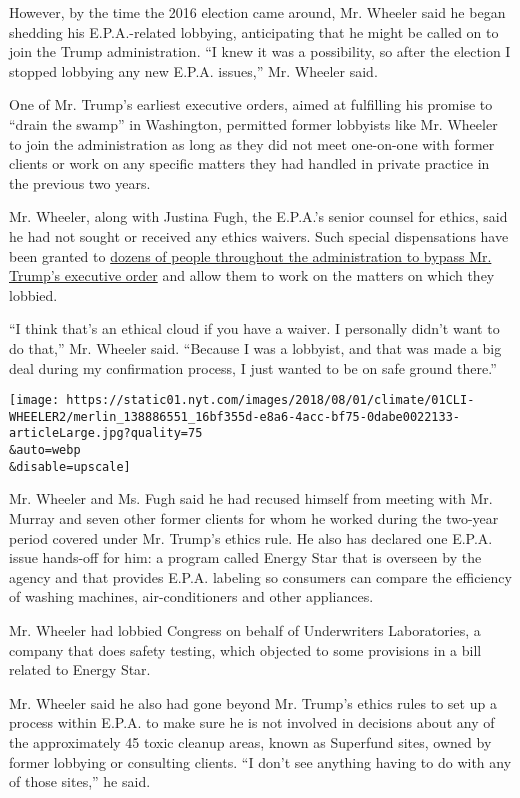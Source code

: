 However, by the time the 2016 election came around, Mr. Wheeler said he
began shedding his E.P.A.-related lobbying, anticipating that he might
be called on to join the Trump administration. ``I knew it was a
possibility, so after the election I stopped lobbying any new E.P.A.
issues,'' Mr. Wheeler said.

One of Mr. Trump's earliest executive orders, aimed at fulfilling his
promise to ``drain the swamp'' in Washington, permitted former lobbyists
like Mr. Wheeler to join the administration as long as they did not meet
one-on-one with former clients or work on any specific matters they had
handled in private practice in the previous two years.

Mr. Wheeler, along with Justina Fugh, the E.P.A.'s senior counsel for
ethics, said he had not sought or received any ethics waivers. Such
special dispensations have been granted to
\href{https://www.nytimes.com/2017/06/07/us/politics/lobbyists-ethics-waivers-trump-administration.html}{dozens
of people throughout the administration to bypass Mr. Trump's executive
order} and allow them to work on the matters on which they lobbied.

``I think that's an ethical cloud if you have a waiver. I personally
didn't want to do that,'' Mr. Wheeler said. ``Because I was a lobbyist,
and that was made a big deal during my confirmation process, I just
wanted to be on safe ground there.''

\texttt{[image: https://static01.nyt.com/images/2018/08/01/climate/01CLI-WHEELER2/merlin\_138886551\_16bf355d-e8a6-4acc-bf75-0dabe0022133-articleLarge.jpg?quality=75\\\&auto=webp\\\&disable=upscale]}

Mr. Wheeler and Ms. Fugh said he had recused himself from meeting with
Mr. Murray and seven other former clients for whom he worked during the
two-year period covered under Mr. Trump's ethics rule. He also has
declared one E.P.A. issue hands-off for him: a program called Energy
Star that is overseen by the agency and that provides E.P.A. labeling so
consumers can compare the efficiency of washing machines,
air-conditioners and other appliances.

Mr. Wheeler had lobbied Congress on behalf of Underwriters Laboratories,
a company that does safety testing, which objected to some provisions in
a bill related to Energy Star.

Mr. Wheeler said he also had gone beyond Mr. Trump's ethics rules to set
up a process within E.P.A. to make sure he is not involved in decisions
about any of the approximately 45 toxic cleanup areas, known as
Superfund sites, owned by former lobbying or consulting clients. ``I
don't see anything having to do with any of those sites,'' he said.

